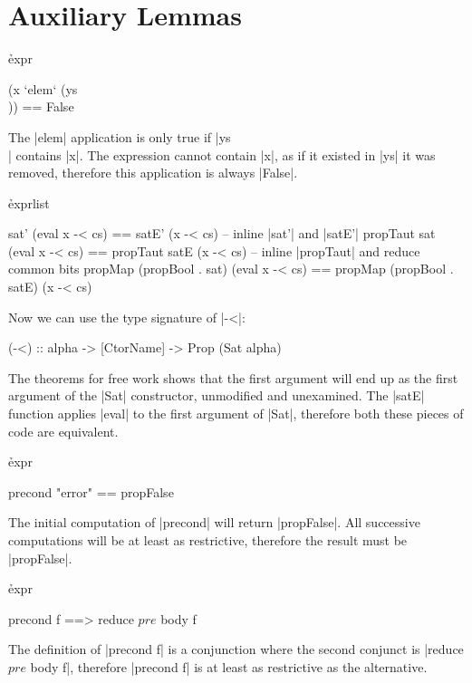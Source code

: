 \section{Auxiliary Lemmas}


\h{expr}\begin{code}
(x `elem` (ys \\ [x])) == False
\end{code}

The |elem| application is only true if |ys \\ [x]| contains |x|. The expression cannot contain |x|, as if it existed in |ys| it was removed, therefore this application is always |False|.



\h{exprlist}\begin{code}
sat' (eval x -< cs) == satE' (x -< cs)
    -- \eq inline |sat'| and |satE'|
propTaut sat (eval x -< cs) == propTaut satE (x -< cs)
    -- \eq inline |propTaut| and reduce common bits
propMap (propBool . sat) (eval x -< cs) == propMap (propBool . satE) (x -< cs)
\end{code}

Now we can use the type signature of |-<|:

\begin{code}
(-<) :: alpha -> [CtorName] -> Prop (Sat alpha)
\end{code}

The theorems for free work \cite{wadler:theorems} shows that the first argument will end up as the first argument of the |Sat| constructor, unmodified and unexamined. The |satE| function applies |eval| to the first argument of |Sat|, therefore both these pieces of code are equivalent.



\h{expr}\begin{code}
precond "error" == propFalse
\end{code}

The initial computation of |precond| will return |propFalse|. All successive computations will be at least as restrictive, therefore the result must be |propFalse|.



\h{expr}\begin{code}
precond f ==> reduce $ pre $ body f
\end{code}

The definition of |precond f| is a conjunction where the second conjunct is |reduce $ pre $ body f|, therefore |precond f| is at least as restrictive as the alternative.


